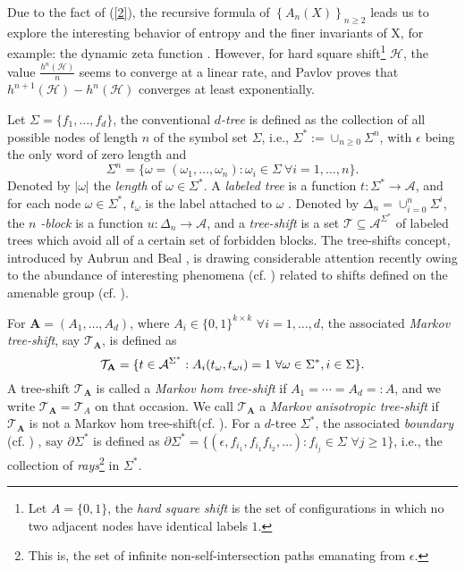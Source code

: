 \documentclass{amsart}
\theoremstyle{definition}
\begin{document}
Due to the fact of (\ref{2}), the recursive formula of $\left\{
A_{n}(X)\right\} _{n\geq 2}$ leads us to explore the interesting behavior of
entropy and the finer invariants of X, for example: the dynamic zeta
function \cite{ban2013zeta}. However, for hard square shift\footnote{%
Let $A=\{0,1\}$, the \emph{hard square shift} is the set of configurations in which no two adjacent nodes have identical labels $1$.} $\mathcal{H}$, the value $\frac{h^{n}(\mathcal{H})}{n}$ seems to converge at a linear rate, and Pavlov 
\cite{pavlov2012approximating} proves that $h^{n+1}(\mathcal{H})-h^{n}(%
\mathcal{H})$ converges at least exponentially.

Let $\Sigma =\mathcal{\{}f_{1},\ldots ,f_{d}\mathcal{\}}$, the conventional $%
d$\emph{-tree} is defined as the collection of all possible nodes of length 
$n$ of the symbol set $\Sigma $, i.e., $\Sigma ^{\ast }:=\cup _{n\geq
0}\Sigma ^{n}$, with $\epsilon $ being the only word of zero length and 
\[\Sigma^{n}=\{\omega =(\omega _{1},\ldots ,\omega _{n}):\omega _{i}\in \Sigma~\forall i=1,\ldots ,n\}.\] Denoted by $\left\vert \omega \right\vert $
the \emph{length} of $\omega \in \Sigma ^{\ast }$. A \emph{labeled tree }is
a function $t:\Sigma ^{\ast }\rightarrow \mathcal{A}$, and for each node $%
\omega \in \Sigma ^{\ast }$, $t_{\omega }$ is the label attached to $\omega $%
. Denoted by $\Delta _{n}=\cup _{i=0}^{n}\Sigma ^{i}$, the $n$\emph{%
-block }is a function $u:\Delta _{n}\rightarrow \mathcal{A}$, and a \emph{%
tree-shift} is a set $\mathcal{T}\subseteq \mathcal{A}^{\Sigma ^{\ast }}$ of
labeled trees which avoid all of a certain set of forbidden blocks. The tree-shifts concept, introduced by Aubrun and Beal \cite{aubrun2012tree}, is drawing considerable attention recently owing to the abundance of interesting phenomena (cf. \cite{petersen2021asymptotic, ban2017mixing, ban2017tree,
ban2021structure, petersen2020entropy}) related to shifts defined on the amenable group (cf. \cite{lemp2017shift, ceccherini2010cellular}).

For $\mathbf{A}=\left( A_{1},\ldots ,A_{d}\right) $, where $A_{i}\in
\{0,1\}^{k\times k}$ $\forall i=1,\ldots ,d$, the associated \emph{Markov
tree-shift}, say $\mathcal{T}_{\mathbf{A}}$, is defined as 
\[\mathcal{T}_{%
\mathbf{A}}=\{t\in \mathcal{A}^{\Sigma ^{\ast }}:A_{i}(t_{\omega },t_{\omega
i})=1~\forall \omega \in \Sigma ^{\ast },i\in \Sigma \}.\] A tree-shift $%
\mathcal{T}_{\mathbf{A}}$ is called a \emph{Markov hom tree-shift} if $%
A_{1}=\cdots =A_{d}=:A$, and we write $\mathcal{T}_{\mathbf{A}}=\mathcal{T}%
_{A}$ on that occasion. We call $\mathcal{T}_{\mathbf{A}}$ a \emph{Markov
anisotropic tree-shift} if $\mathcal{T}_{\mathbf{A}}$ is not a Markov hom tree-shift(cf. \cite{chandgotia2016mixing,petersen2020entropy}). For a $d$-tree $\Sigma ^{\ast }$, the associated \emph{boundary} (cf. \cite{benjamini1994markov})%
, say $\partial \Sigma ^{\ast }$ is defined as $\partial \Sigma ^{\ast
}=\{(\epsilon ,f_{i_{1}},f_{i_{1}}f_{i_{2}},\ldots ):f_{i_{j}}\in \Sigma $ $%
\forall j\geq 1\}$, i.e., the collection of \emph{rays}\footnote{%
This is, the set of infinite non-self-intersection paths emanating from $%
\epsilon $.} in $\Sigma ^{\ast }$. 
\end{document}
